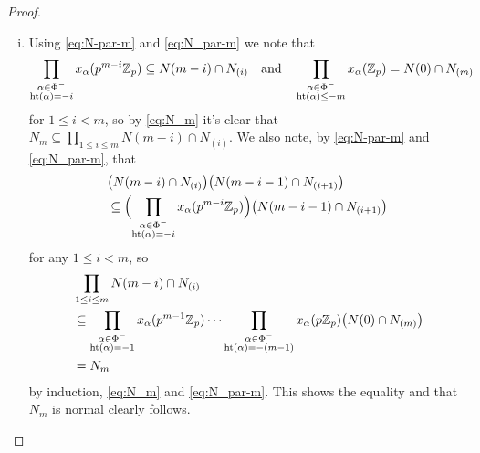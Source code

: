 \begin{proof}
  \begin{enumerate}[(i),wide]
  \item Using \eqref{eq:N-par-m} and \eqref{eq:N_par-m} we note that
    \begin{equation*}
      \prod_{\substack{\alpha\in \Phi^{-} \\ \operatorname{ht}(\alpha) = -i}} x_\alpha(p^{m-i} \mathbb{Z}_p) \subseteq N(m-i) \cap N_{(i)} \quad \text{and} \quad \prod_{\substack{\alpha\in \Phi^{-} \\ \operatorname{ht}(\alpha) \leq -m}} x_\alpha(\mathbb{Z}_p) = N(0) \cap N_{(m)}
    \end{equation*}
    for $1 \leq i < m$, so by \eqref{eq:N_m} it's clear that $N_m \subseteq \prod_{1 \leq i \leq m} N(m-i) \cap N_{(i)}$. We also note, by \eqref{eq:N-par-m} and \eqref{eq:N_par-m}, that
    \begin{align*}
      &\bigl( N(m-i) \cap N_{(i)} \bigr)\bigl( N(m-i-1) \cap N_{(i+1)} \bigr) \\
      &\subseteq \Bigl( \prod_{\substack{\alpha\in \Phi^{-} \\ \operatorname{ht}(\alpha) = -i}} x_\alpha(p^{m-i} \mathbb{Z}_p) \Bigr)\bigl( N(m-i-1) \cap N_{(i+1)} \bigr)
    \end{align*}
    for any $1 \leq i < m$, so
    \begin{align*}
      &\prod_{1 \leq i \leq m} N(m-i) \cap N_{(i)} \\
      &\subseteq \prod_{\substack{\alpha\in \Phi^{-} \\ \operatorname{ht}(\alpha) = -1}} x_\alpha(p^{m-1} \mathbb{Z}_p) \dotsb \prod_{\substack{\alpha\in \Phi^{-} \\ \operatorname{ht}(\alpha) = -(m-1)}} x_\alpha(p \mathbb{Z}_p) \bigl( N(0) \cap N_{(m)} \bigr) \\
      &= N_m
    \end{align*}
    by induction, \eqref{eq:N_m} and \eqref{eq:N_par-m}. This shows the equality and that $N_m$ is normal clearly follows.


\end{enumerate}
\end{proof}
